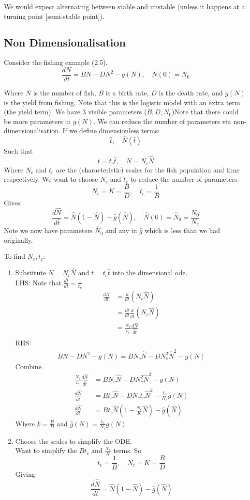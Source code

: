 \documentclass{/home/janmebows/Documents/LatexTemplates/myassignment}
\begin{document}
We would expect alternating between stable and unstable (unless it happens at a turning point [semi-stable point]).



\subsection{Non Dimensionalisation}
Consider the fishing example (2.5).
\[\frac{dN}{dt} = BN - DN^2 - g(N), \quad N(0) = N_0\]

Where $N$ is the number of fish, $B$ is a birth rate, $D$ is the death rate, and $g(N)$ is the yield from fishing. Note that this is the logistic model with an extra term (the yield term). We have 3 visible parameters ($B,D,N_0$)Note that there could be more parameters in $g(N)$.
We can reduce the number of parameters via non-dimensionalisation.
If we define dimensionless terms:
\[ \hat{t}, \quad \hat{N}(\hat{t}) \]
Such that
\[t = t_c \hat{t}, \quad N = N_c \hat{N}\]
Where $N_c$ and $t_c$ are the (characteristic) scales for the fish population and time respectively.
We want to choose $N_c$ and $t_c$ to reduce the number of parameters.
\[N_c = K = \frac{B}{D}, \quad t_c = \frac1B\]
Gives:
\[\frac{d\hat{N}}{d\hat{t}} = \hat{N}(1-\hat{N}) - \hat{g}(\hat{N}), \quad \hat{N}(0) = \hat{N}_0 = \frac{N_0}{N_c}\]
Note we now have parameters $\hat{N}_0$ and any in $\hat{g}$ which is less than we had originally.

To find $N_c,t_c$:
\begin{enumerate}
    \item Substitute $N=N_c\hat{N}$ and $t=t_c\hat{t}$ into the dimensional ode.\\
    LHS:
    Note that $\frac{d\hat{t}}{dt} = \frac1{t_c}$
    \begin{align*}
        \frac{dN}{dt} &= \frac{d}{dt}( N_c\hat{N})\\
        &= \frac{d\hat{t}}{dt} \frac{d}{d\hat{t}} (N_c\hat{N})\\
        &= \frac{N_c}{t_c} \frac{d\hat{N}}{d\hat{t}}\\
    \end{align*}
    RHS:
    \begin{align*}
        BN - DN^2 - g(N) = B N_c \hat{N} - D N_c^2 \hat{N}^2 - g(N)
    \end{align*}
    Combine
    \begin{align*}
        \frac{N_c}{t_c} \frac{d\hat{N}}{d\hat{t}}&=  B N_c \hat{N} - D N_c^2 \hat{N}^2 - g(N)\\
        \frac{d\hat{N}}{d\hat{t}}&=  Bt_c\hat{N} - D N_c t_c \hat{N}^2 - \frac{t_c}{N_c}g(N)\\
        \frac{d\hat{N}}{dt} &= B t_c \hat{N} (1 - \frac{N_c}{K} \hat{N}) - \hat{g}(\hat{N})
    \end{align*}
    Where $k=\frac{B}{D}$ and $\hat{g}(N) = \frac{t_c}{N_c} g(N)$
    \item Choose the scales to simplify the ODE.\\
    Want to simplify the $Bt_c$ and $\frac{N_c}{K}$ terms.
    So 
    \[t_c = \frac1B,\quad N_c = K = \frac{B}{D}\]
    Giving
    \[\frac{d\hat{N}}{dt} = \hat{N} (1-\hat{N}) - \hat{g}(\hat{N}) \]
\end{enumerate}
\end{document}
